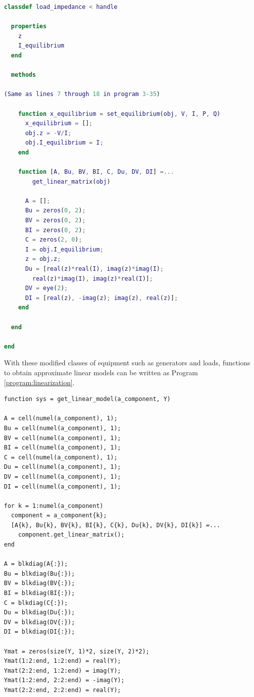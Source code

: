 \documentclass[graybox, envcountchap]{svmult}
\begin{document}
\begin{example}
\smallskip
\begin{lstlisting}[language=Matlab, caption=load\_impedance.m, label={program:load_matrix}]
classdef load_impedance < handle
  
  properties
    z
    I_equilibrium
  end
  
  methods

(Same as lines 7 through 18 in program 3-35)
   
    function x_equilibrium = set_equilibrium(obj, V, I, P, Q)
      x_equilibrium = [];
      obj.z = -V/I;
      obj.I_equilibrium = I;
    end
    
    function [A, Bu, BV, BI, C, Du, DV, DI] =...
        get_linear_matrix(obj)
      
      A = [];
      Bu = zeros(0, 2);
      BV = zeros(0, 2);
      BI = zeros(0, 2);
      C = zeros(2, 0);
      I = obj.I_equilibrium;
      z = obj.z;
      Du = [real(z)*real(I), imag(z)*imag(I);
        real(z)*imag(I), imag(z)*real(I)];
      DV = eye(2);
      DI = [real(z), -imag(z); imag(z), real(z)];
    end
    
  end
  
end
\end{lstlisting}

With these modified classes of equipment such as generators and loads, functions to obtain approximate linear models can be written as Program \ref{program:linearization}.

\smallskip
\begin{PROGRAMA}[count,title={get\_linear\_model.m}]\label{program:linearization}
\begin{verbatim}
function sys = get_linear_model(a_component, Y)

A = cell(numel(a_component), 1);
Bu = cell(numel(a_component), 1);
BV = cell(numel(a_component), 1);
BI = cell(numel(a_component), 1);
C = cell(numel(a_component), 1);
Du = cell(numel(a_component), 1);
DV = cell(numel(a_component), 1);
DI = cell(numel(a_component), 1);

for k = 1:numel(a_component)
  component = a_component{k};
  [A{k}, Bu{k}, BV{k}, BI{k}, C{k}, Du{k}, DV{k}, DI{k}] =...
    component.get_linear_matrix();
end

A = blkdiag(A{:});
Bu = blkdiag(Bu{:});
BV = blkdiag(BV{:});
BI = blkdiag(BI{:});
C = blkdiag(C{:});
Du = blkdiag(Du{:});
DV = blkdiag(DV{:});
DI = blkdiag(DI{:});

Ymat = zeros(size(Y, 1)*2, size(Y, 2)*2);
Ymat(1:2:end, 1:2:end) = real(Y);
Ymat(2:2:end, 1:2:end) = imag(Y);
Ymat(1:2:end, 2:2:end) = -imag(Y);
Ymat(2:2:end, 2:2:end) = real(Y);


\end{verbatim}
\end{PROGRAMA}
\end{example}
\end{document}
